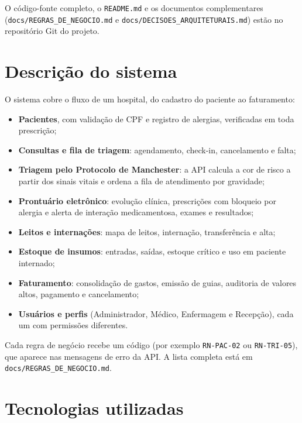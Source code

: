 \documentclass[12pt,a4paper]{article}
\newcommand{\cod}[1]{\texttt{#1}}
\begin{document}
O código-fonte completo, o \cod{README.md} e os documentos complementares
(\cod{docs/REGRAS\_DE\_NEGOCIO.md} e \cod{docs/DECISOES\_ARQUITETURAIS.md}) estão no
repositório Git do projeto.

\section{Descrição do sistema}

O sistema cobre o fluxo de um hospital, do cadastro do paciente ao faturamento:

\begin{itemize}[itemsep=2pt]
  \item \textbf{Pacientes}, com validação de CPF e registro de alergias, verificadas em toda prescrição;
  \item \textbf{Consultas e fila de triagem}: agendamento, check-in, cancelamento e falta;
  \item \textbf{Triagem pelo Protocolo de Manchester}: a API calcula a cor de risco a partir dos
        sinais vitais e ordena a fila de atendimento por gravidade;
  \item \textbf{Prontuário eletrônico}: evolução clínica, prescrições com bloqueio por alergia e alerta
        de interação medicamentosa, exames e resultados;
  \item \textbf{Leitos e internações}: mapa de leitos, internação, transferência e alta;
  \item \textbf{Estoque de insumos}: entradas, saídas, estoque crítico e uso em paciente internado;
  \item \textbf{Faturamento}: consolidação de gastos, emissão de guias, auditoria de valores altos,
        pagamento e cancelamento;
  \item \textbf{Usuários e perfis} (Administrador, Médico, Enfermagem e Recepção), cada um com
        permissões diferentes.
\end{itemize}

Cada regra de negócio recebe um código (por exemplo \cod{RN-PAC-02} ou \cod{RN-TRI-05}), que
aparece nas mensagens de erro da API. A lista completa está em
\cod{docs/REGRAS\_DE\_NEGOCIO.md}.

\section{Tecnologias utilizadas}
\end{document}
